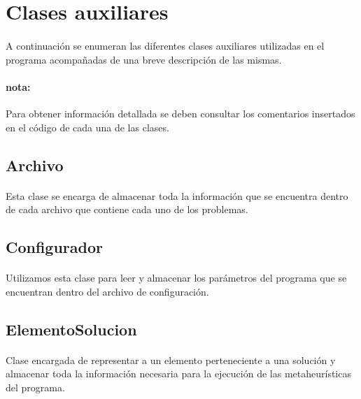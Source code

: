 \documentclass{article}
\begin{document}
	\section{Clases auxiliares}
	
	\paragraph{} A continuación se enumeran las diferentes clases auxiliares utilizadas en el programa acompañadas de una breve descripción de las mismas.
	
	\paragraph{nota:}Para obtener información detallada se deben consultar los comentarios insertados en el código de cada una de las clases.
	
	\subsection{Archivo}
	
	\paragraph{}Esta clase se encarga de almacenar toda la información que se encuentra dentro de cada archivo que contiene cada uno de los problemas.
	
	
	\subsection{Configurador}
	
	\paragraph{}Utilizamos esta clase para leer y almacenar los parámetros del programa que se encuentran dentro del archivo de configuración.
	
	\subsection{ElementoSolucion}
	
	\paragraph{}Clase encargada de representar a un elemento perteneciente a una solución y almacenar toda la información necesaria para la ejecución de las metaheurísticas del programa.
	
\end{document}
